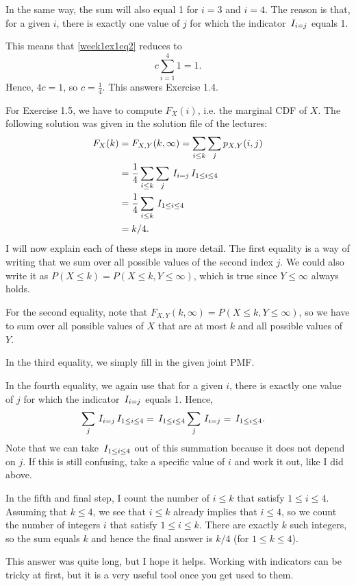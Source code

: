 \documentclass[a4paper,11pt]{article}
\begin{document}
\begin{exercise}
\begin{solution}
In the same way, the sum will also equal 1 for $i=3$ and $i=4$. The reason is that, for a given $i$, there is exactly one value of $j$ for which the indicator $ \,I_{i=j}$ equals 1.

This means that \eqref{week1ex1eq2} reduces to 
\begin{equation}
c \sum_{i=1}^4 1 = 1. 
\end{equation}
Hence, $4c = 1$, so $c=\tfrac14$. This answers Exercise 1.4.

For Exercise 1.5, we have to compute $F_{X}(i)$, i.e. the marginal CDF of $X$.  The following solution was given in the solution file of the lectures: 
\begin{align}
F_X(k) &=  F_{X,Y}(k, \infty ) = \sum_{i\leq k} \sum_j p_{X,Y}(i,j) \\
 &= \frac{1}{4}\sum_{i\leq k} \sum_j \,I_{i=j}\,I_{1\leq i \leq 4}\\
 &= \frac{1}{4}\sum_{i\leq k} \,I_{1\leq i \leq 4} \\
&=k/4.
\end{align}
I will now explain each of these steps in more detail. The first equality is a way of writing that we sum over all possible values of the second index $j$. We could also write it as $P(X \leq k) = P(X \leq k, Y \leq \infty)$, which is true since $Y \leq \infty$ always holds.

For the second equality, note that $F_{X,Y}(k, \infty ) = P(X \leq k, Y \leq \infty)$, so we have to sum over all possible values of $X$ that are at most $k$ and all possible values of $Y$.

In the third equality, we simply fill in the given joint PMF.

In the fourth equality, we again use that for a given $i$, there is exactly one value of $j$ for which the indicator $ \,I_{i=j}$ equals 1. Hence,
\begin{align*}
\sum_j \,I_{i=j}\,I_{1\leq i \leq 4} &= \,I_{1\leq i \leq 4} \sum_j \,I_{i=j}  = \,I_{1\leq i \leq 4}.
\end{align*}
Note that we can take $\,I_{1\leq i \leq 4}$ out of this summation because it does not depend on $j$. If this is still confusing, take a specific value of $i$ and work it out, like I did above.

In the fifth and final step, I count the number of $i \leq k$ that satisfy $1 \leq i \leq 4$. Assuming that $k \leq 4$, we see that $i \leq k$ already implies that $i \leq 4$, so we count the number of integers $i$ that satisfy $1 \leq i \leq k$. There are exactly $k$ such integers, so the sum equals $k$ and hence the final answer is $k/4$ (for $1 \leq k \leq 4$). 

This answer was quite long, but I hope it helps. Working with indicators can be tricky at first, but it is a very useful tool once you get used to them.
\end{solution}
\end{exercise}
\end{document}
